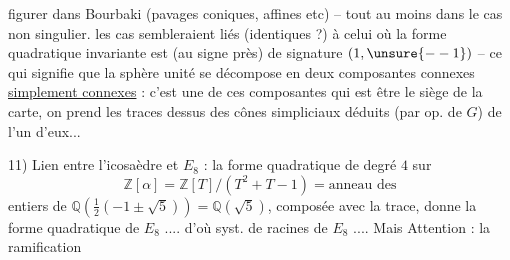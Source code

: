 figurer dans Bourbaki (pavages coniques, affines etc) -- tout au moins dans le cas  non singulier.  les cas sembleraient liés (identiques ?) à celui où la forme quadratique invariante est (au signe près) de signature $(1,\unsure{--1})$ -- ce qui signifie que la sphère unité se décompose en deux composantes connexes \uline{simplement connexes} : c'est une de ces composantes qui est  être le siège de la  carte, on prend les traces dessus des cônes simpliciaux déduits (par op. de $G$) de l'un d'eux...

11) Lien entre l'icosaèdre et $E_8$ : la  forme quadratique de degré $4$ sur
\[
\mathbb Z[\alpha]=\mathbb Z[T]/(T^2+T-1)=\text{anneau des}
\]
entiers de $\mathbb Q(\tfrac12(-1\pm\sqrt5))=\mathbb Q(\sqrt5)$, composée avec la trace, donne la forme quadratique de $E_8$ .... d'où syst. de racines de $E_8$ .... Mais Attention : la ramification

